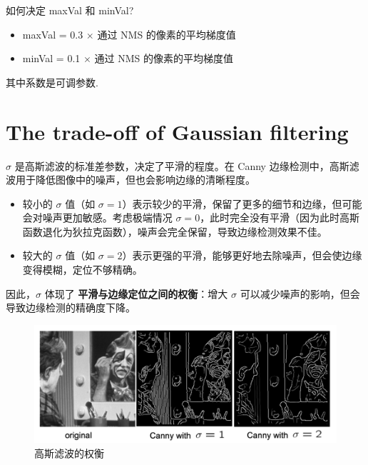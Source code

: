 如何决定 maxVal 和 minVal?

\begin{itemize}
    \item maxVal = 0.3 $\times$ 通过 NMS 的像素的平均梯度值
    \item minVal = 0.1 $\times$ 通过 NMS 的像素的平均梯度值
\end{itemize}

其中系数是可调参数.

\section{The trade-off of Gaussian filtering}

$\sigma$ 是高斯滤波的标准差参数，决定了平滑的程度。在 Canny 边缘检测中，高斯滤波用于降低图像中的噪声，但也会影响边缘的清晰程度。

\begin{itemize}
    \item 较小的 $\sigma$ 值（如 $\sigma = 1$）表示较少的平滑，保留了更多的细节和边缘，但可能会对噪声更加敏感。考虑极端情况 $\sigma = 0$，此时完全没有平滑（因为此时高斯函数退化为狄拉克函数），噪声会完全保留，导致边缘检测效果不佳。
    \item 较大的 $\sigma$ 值（如 $\sigma = 2$）表示更强的平滑，能够更好地去除噪声，但会使边缘变得模糊，定位不够精确。
\end{itemize}

因此，$\sigma$ 体现了 \textbf{平滑与边缘定位之间的权衡}：增大 $\sigma$ 可以减少噪声的影响，但会导致边缘检测的精确度下降。

\begin{figure}[htbp]
    \centering
	\includegraphics[scale=0.2]{figures/tradeoff-in-gauss-filtering.png}
	\caption{高斯滤波的权衡}
\end{figure}

